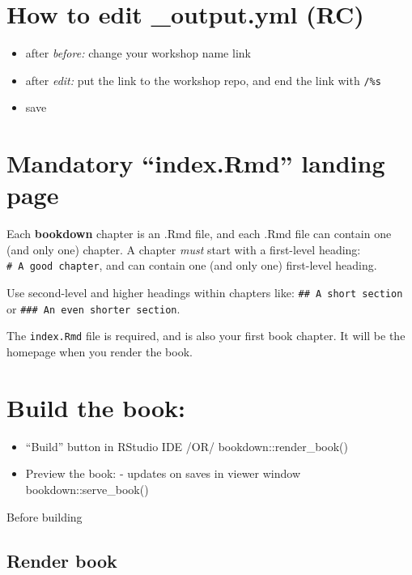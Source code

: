 \documentclass[
]{book}
\providecommand{\tightlist}{%
  \setlength{\itemsep}{0pt}\setlength{\parskip}{0pt}}
\theoremstyle{definition}
\theoremstyle{definition}
\theoremstyle{definition}
\theoremstyle{definition}
\theoremstyle{remark}
\begin{document}
\section{How to edit \_output.yml (RC)}\label{how-to-edit-_output.yml-rc}

\begin{itemize}
\tightlist
\item
  after \emph{before:} change your workshop name link
\item
  after \emph{edit:} put the link to the workshop repo, and end the link with \texttt{/\%s}
\item
  save
\end{itemize}

\section{Mandatory ``index.Rmd'' landing page}\label{mandatory-index.rmd-landing-page}

Each \textbf{bookdown} chapter is an .Rmd file, and each .Rmd file can contain one (and only one) chapter. A chapter \emph{must} start with a first-level heading: \texttt{\#\ A\ good\ chapter}, and can contain one (and only one) first-level heading.

Use second-level and higher headings within chapters like: \texttt{\#\#\ A\ short\ section} or \texttt{\#\#\#\ An\ even\ shorter\ section}.

The \texttt{index.Rmd} file is required, and is also your first book chapter. It will be the homepage when you render the book.

\section{Build the book:}\label{build-the-book}

\begin{itemize}
\tightlist
\item
  ``Build'' button in RStudio IDE /OR/ bookdown::render\_book()
\item
  Preview the book: - updates on saves in viewer window bookdown::serve\_book()
\end{itemize}

Before building

\subsection{Render book}\label{render-book}
\end{document}
